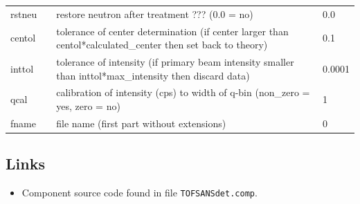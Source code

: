 \begin{longtable}{p{}p{}p{}p{}}
rstneu &  & restore neutron after treatment ??? (0.0 = no) & 0.0 \\
centol &  & tolerance of center determination (if center larger than centol*calculated\_center then set back to theory) & 0.1 \\
inttol &  & tolerance of intensity            (if primary beam intensity smaller than inttol*max\_intensity then discard data) & 0.0001 \\
qcal &  & calibration of intensity (cps) to width of q-bin (non\_zero = yes, zero = no) & 1 \\
fname &  & file name (first part without extensions) & 0 \\
\bottomrule
\end{longtable}

\subsection*{Links}
\begin{itemize}
  \item Component source code found in file \texttt{TOFSANSdet.comp}.
\end{itemize}
